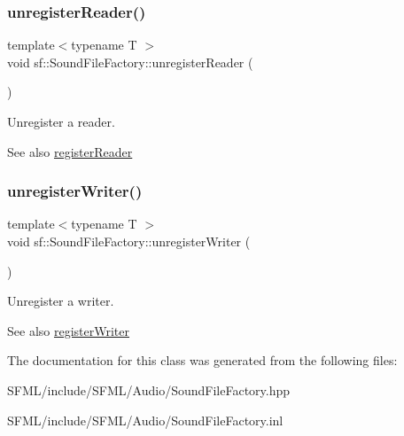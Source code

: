 \subsubsection{\texorpdfstring{unregisterReader()}{unregisterReader()}}
{\footnotesize\ttfamily template$<$typename T $>$ \\
void sf\+::\+Sound\+File\+Factory\+::unregister\+Reader (\begin{DoxyParamCaption}{ }\end{DoxyParamCaption})\hspace{0.3cm}{\ttfamily [static]}}



Unregister a reader. 

\begin{DoxySeeAlso}{See also}
\mbox{\hyperlink{classsf_1_1_sound_file_factory_acaf1f0bf1b7c7b9988ec76b33e33fe95}{register\+Reader}} \begin{DoxyVerb}\end{DoxyVerb}
 
\end{DoxySeeAlso}
\mbox{\label{classsf_1_1_sound_file_factory_a2306f90d1f72e474732e4bcceeb34215}} 
\subsubsection{\texorpdfstring{unregisterWriter()}{unregisterWriter()}}
{\footnotesize\ttfamily template$<$typename T $>$ \\
void sf\+::\+Sound\+File\+Factory\+::unregister\+Writer (\begin{DoxyParamCaption}{ }\end{DoxyParamCaption})\hspace{0.3cm}{\ttfamily [static]}}



Unregister a writer. 

\begin{DoxySeeAlso}{See also}
\mbox{\hyperlink{classsf_1_1_sound_file_factory_a3a59140e6ccf1f252f721b790eddd661}{register\+Writer}} \begin{DoxyVerb}\end{DoxyVerb}
 
\end{DoxySeeAlso}


The documentation for this class was generated from the following files\+:\begin{DoxyCompactItemize}
\item 
S\+F\+M\+L/include/\+S\+F\+M\+L/\+Audio/Sound\+File\+Factory.\+hpp\item 
S\+F\+M\+L/include/\+S\+F\+M\+L/\+Audio/Sound\+File\+Factory.\+inl\end{DoxyCompactItemize}
